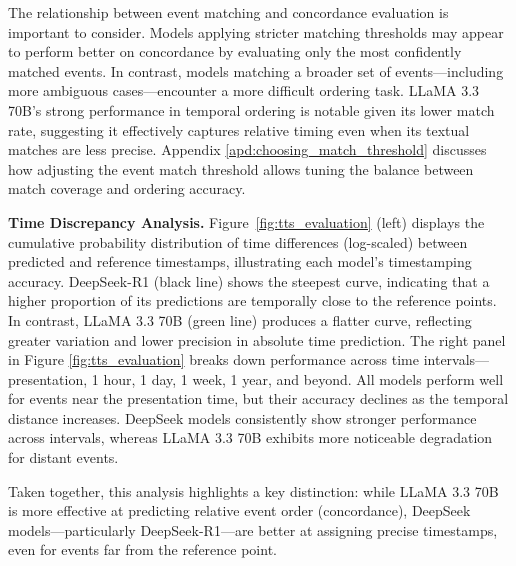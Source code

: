 The relationship between event matching and concordance evaluation is important to consider. Models applying stricter matching thresholds may appear to perform better on concordance by evaluating only the most confidently matched events. In contrast, models matching a broader set of events—including more ambiguous cases—encounter a more difficult ordering task. LLaMA 3.3 70B’s strong performance in temporal ordering is notable given its lower match rate, suggesting it effectively captures relative timing even when its textual matches are less precise.
Appendix \ref{apd:choosing_match_threshold} discusses how adjusting the event match threshold allows tuning the balance between match coverage and ordering accuracy.


\textbf{Time Discrepancy Analysis.} Figure~\ref{fig:tts_evaluation} (left) displays the cumulative probability distribution of time differences (log-scaled) between predicted and reference timestamps, illustrating each model’s timestamping accuracy.
DeepSeek-R1 (black line) shows the steepest curve, indicating that a higher proportion of its predictions are temporally close to the reference points. In contrast, LLaMA 3.3 70B (green line) produces a flatter curve, reflecting greater variation and lower precision in absolute time prediction. The right panel in Figure \ref{fig:tts_evaluation} breaks down performance across time intervals—presentation, 1 hour, 1 day, 1 week, 1 year, and beyond. All models perform well for events near the presentation time, but their accuracy declines as the temporal distance increases. DeepSeek models consistently show stronger performance across intervals, whereas LLaMA 3.3 70B exhibits more noticeable degradation for distant events.

Taken together, this analysis highlights a key distinction: while LLaMA 3.3 70B is more effective at predicting relative event order (concordance), DeepSeek models—particularly DeepSeek-R1—are better at assigning precise timestamps, even for events far from the reference point.



